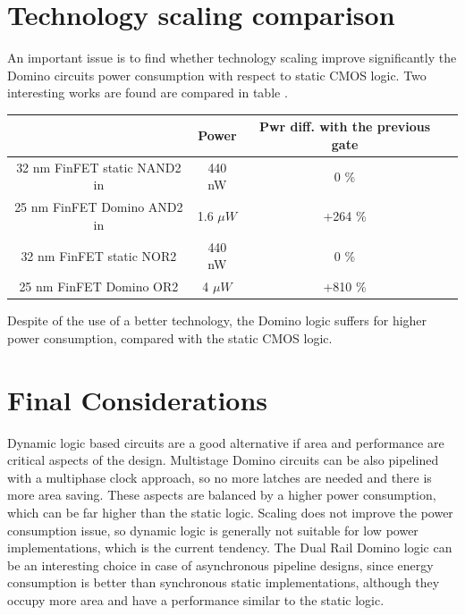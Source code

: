 \section{Technology scaling comparison}
An important issue is to find whether technology scaling improve significantly the Domino circuits power consumption with respect to static CMOS logic. Two interesting works are found are compared in table .
\begin{table}[H]
\centering
\begin{tabular}{|c|c|c|c|}
\hline 
 & Power & Pwr diff. with the previous gate \\ 
\hline 
32 nm FinFET static NAND2 in \cite{Nalamwar} & 440 nW & 0 \% \\ 
\hline 
25 nm FinFET Domino AND2 in \cite{Rasouli} & 1.6 $\mu W$ & +264 \% \\
\hline 
32 nm FinFET static NOR2 \cite{Nalamwar} & 440 nW & 0 \% \\ 
\hline 
25 nm FinFET Domino OR2 \cite{Rasouli} & 4 $\mu W$ & +810 \% \\ 
\hline 
\end{tabular} 
\end{table}
Despite of the use of a better technology, the Domino logic suffers for higher power consumption, compared with the static CMOS logic.

\section{Final Considerations}
Dynamic logic based circuits are a good alternative if area and performance are critical aspects of the design. Multistage Domino circuits can be also pipelined with a multiphase clock approach, so no more latches are needed and there is more area saving. These aspects are  balanced by a higher power consumption, which can be far higher than the static logic. Scaling does not improve the power consumption issue, so dynamic logic is generally not suitable for low power implementations, which is the current tendency. The Dual Rail Domino logic can be an interesting choice in case of asynchronous pipeline designs, since energy consumption is better than synchronous static implementations, although they occupy more area and have a performance similar to the static logic.